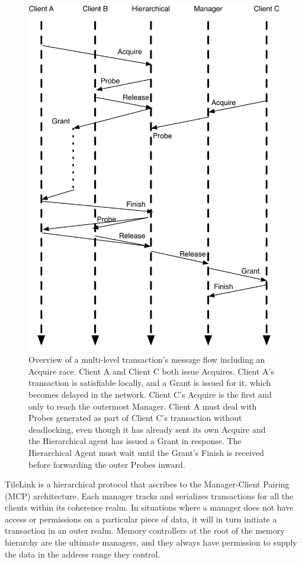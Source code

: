 \begin{figure}[!p]
\centering
\includegraphics[width=0.8\columnwidth]{tilelink/figures/acq-merge-5-2.pdf}
\caption[Another multi-level message flow including an Acquire race.]{
Overview of a multi-level transaction's message flow including an Acquire race.
Client A and Client C both issue Acquires.
Client A's transaction is satisfiable locally, and a Grant is issued for it, which becomes delayed in the network.
Client C's Acquire is the first and only to reach the outermost Manager.
Client A must deal with Probes generated as part of Client C's transaction without deadlocking, even though it has already sent its own Acquire
and the Hierarchical agent has issued a Grant in response.
The Hierarchical Agent must wait until the Grant's Finish is received before forwarding the outer Probes inward.
}
\label{fig:acq-merge-5-2}
\end{figure}

TileLink is a hierarchical protocol that ascribes to the Manager-Client Pairing (MCP) architecture.
Each manager tracks and serializes transactions for all the clients within its coherence realm.
In situations where a manager does not have access or permissions on a particular piece of data,
it will in turn initiate a transaction in an outer realm.
Memory controllers at the root of the memory hierarchy are the ultimate managers, and they always have permission
to supply the data in the address range they control.

